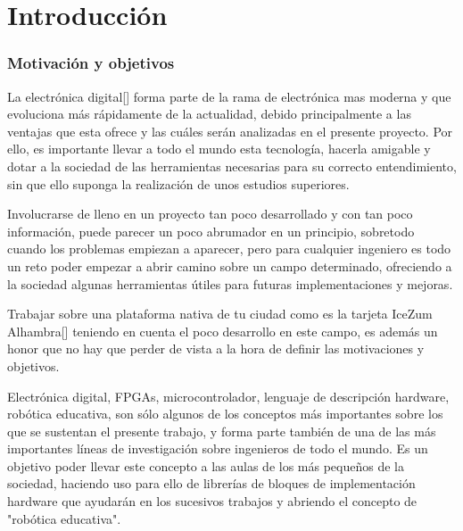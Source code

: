 \chapter{Introducción}\label{sec:intro}
\subsection{Motivación y objetivos}
La electrónica digital[] forma parte de la rama de electrónica mas moderna y que evoluciona más rápidamente de la actualidad, debido principalmente a las ventajas que esta ofrece y las cuáles serán analizadas en el presente proyecto. Por ello, es importante llevar a todo el mundo esta tecnología, hacerla amigable y dotar a la sociedad de las herramientas necesarias para su correcto entendimiento, sin que ello suponga la realización de unos estudios superiores. \newline

Involucrarse de lleno en un proyecto tan poco desarrollado y con tan poco información, puede parecer un poco abrumador en un principio, sobretodo cuando los problemas empiezan a aparecer, pero para cualquier ingeniero es todo un reto poder empezar a abrir camino sobre un campo determinado, ofreciendo a la sociedad algunas herramientas útiles para futuras implementaciones y mejoras. \newline

Trabajar sobre una plataforma nativa de tu ciudad como es la tarjeta IceZum Alhambra[] teniendo en cuenta el poco desarrollo en este campo, es además un honor que no hay que perder de vista a la hora de definir las motivaciones y objetivos. \newline

Electrónica digital, FPGAs, microcontrolador, lenguaje de descripción hardware, robótica educativa, son sólo algunos de los conceptos más importantes sobre los que se sustentan el presente trabajo, y forma parte también de una de las más importantes líneas de investigación sobre ingenieros de todo el mundo. Es un objetivo poder llevar este concepto a las aulas de los más pequeños de la sociedad, haciendo uso para ello de librerías de bloques de implementación hardware que ayudarán en los sucesivos trabajos y abriendo el concepto de "robótica educativa". \newline

